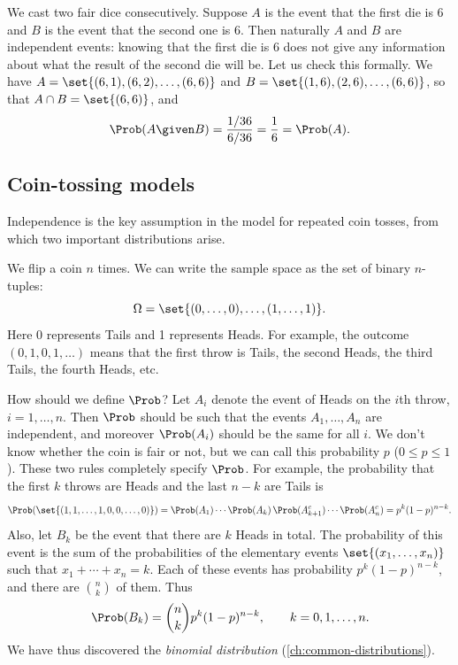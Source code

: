 \begin{example}\label{ex:two-dice-independent}
We cast two fair dice consecutively. Suppose $A$ is the event that the first die is 6 and $B$ is the event that the second one is 6. Then naturally $A$ and $B$ are independent events: knowing that the first die is 6 does not give any information about what the result of the second die will be. Let us check this formally. We have $A = \set{(6,1), (6,2), \ldots, (6,6)}$ and $B = \set{(1,6), (2,6), \ldots, (6,6)}$, so that $A \cap B = \set{(6,6)}$, and
\[
  \Prob(A \given B) = \frac{1/36}{6/36} = \frac16 = \Prob(A).
\]
\end{example}

\subsection{Coin-tossing models}\label{sec:coin-tossing-models}

Independence is the key assumption in the model for repeated coin tosses, from which two important distributions arise.

\begin{example}\label{ex:binomial-law}
We flip a coin $n$ times. We can write the sample space as the set of binary $n$-tuples:
\[
  \Omega = \set{(0, \ldots, 0), \ldots, (1, \ldots, 1)}.
\]
Here 0 represents Tails and 1 represents Heads. For example, the outcome $(0, 1, 0, 1, \ldots)$ means that the first throw is Tails, the second Heads, the third Tails, the fourth Heads, etc.

How should we define $\Prob$? Let $A_i$ denote the event of Heads on the $i$th throw, $i = 1, \ldots, n$. Then $\Prob$ should be such that the events $A_1, \ldots, A_n$ are independent, and moreover $\Prob(A_i)$ should be the same for all $i$. We don't know whether the coin is fair or not, but we can call this probability $p$ ($0 \le p \le 1$). These two rules completely specify $\Prob$. For example, the probability that the first $k$ throws are Heads and the last $n - k$ are Tails is
\[
  \Prob(\set{(1, 1, \ldots, 1, 0, 0, \ldots, 0)}) = \Prob(A_1) \cdots \Prob(A_k)\,\Prob(A_{k+1}^c) \cdots \Prob(A_n^c) = p^k (1-p)^{n-k}.
\]
Also, let $B_k$ be the event that there are $k$ Heads in total. The probability of this event is the sum of the probabilities of the elementary events $\set{(x_1, \ldots, x_n)}$ such that $x_1 + \cdots + x_n = k$. Each of these events has probability $p^k(1-p)^{n-k}$, and there are $\binom{n}{k}$ of them. Thus
\[
  \Prob(B_k) = \binom{n}{k} p^k (1-p)^{n-k}, \qquad k = 0, 1, \ldots, n.
\]
We have thus discovered the \emph{binomial distribution} (\cref{ch:common-distributions}).
\end{example}

